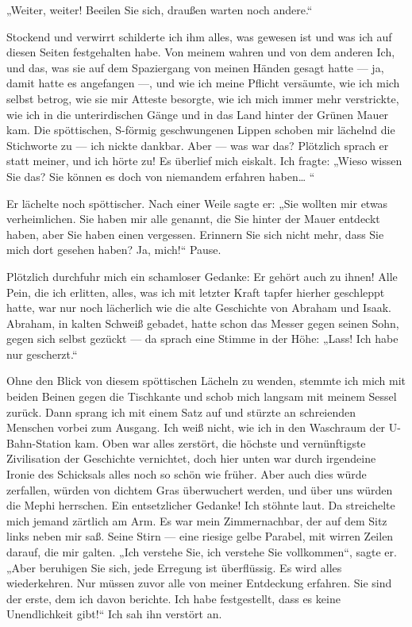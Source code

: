 „Weiter, weiter! Beeilen Sie sich, draußen warten noch andere.“

Stockend und verwirrt schilderte ich ihm alles, was gewesen ist und
was ich auf diesen Seiten festgehalten habe. Von meinem wahren und
von dem anderen Ich, und das, was sie auf dem Spaziergang von
meinen Händen gesagt hatte — ja, damit hatte es angefangen —, und
wie ich meine Pflicht versäumte, wie ich mich selbst betrog, wie
sie mir Atteste besorgte, wie ich mich immer mehr verstrickte, wie
ich in die unterirdischen Gänge und in das Land hinter der Grünen
Mauer kam. Die spöttischen, S-förmig geschwungenen Lippen schoben
mir lächelnd die Stichworte zu — ich nickte dankbar. Aber — was war
das? Plötzlich sprach er statt meiner, und ich hörte zu! Es
überlief mich eiskalt. Ich fragte: „Wieso wissen Sie das? Sie
können es doch von niemandem erfahren haben\ldots{} “

Er lächelte noch spöttischer. Nach einer Weile sagte er: „Sie
wollten mir etwas verheimlichen. Sie haben mir alle genannt, die
Sie hinter der Mauer entdeckt haben, aber Sie haben einen
vergessen. Erinnern Sie sich nicht mehr, dass Sie mich dort gesehen
haben? Ja, mich!“ Pause.

Plötzlich durchfuhr mich ein schamloser Gedanke: Er gehört auch zu
ihnen! Alle Pein, die ich erlitten, alles, was
ich mit letzter Kraft tapfer hierher geschleppt hatte, war nur noch
lächerlich wie die alte Geschichte von Abraham und Isaak. Abraham,
in kalten Schweiß gebadet, hatte schon das Messer gegen seinen
Sohn, gegen sich selbst gezückt — da sprach eine Stimme in der
Höhe: „Lass! Ich habe nur gescherzt.“

Ohne den Blick von diesem spöttischen Lächeln zu wenden, stemmte
ich mich mit beiden Beinen gegen die Tischkante und schob mich
langsam mit meinem Sessel zurück. Dann sprang ich mit einem Satz
auf und stürzte an schreienden Menschen vorbei zum Ausgang. Ich
weiß nicht, wie ich in den Waschraum der U-Bahn-Station kam. Oben
war alles zerstört, die höchste und vernünftigste Zivilisation der
Geschichte vernichtet, doch hier unten war durch irgendeine Ironie
des Schicksals alles noch so schön wie früher. Aber auch dies würde
zerfallen, würden von dichtem Gras überwuchert werden, und über uns
würden die Mephi herrschen. Ein entsetzlicher Gedanke! Ich stöhnte
laut. Da streichelte mich jemand zärtlich am Arm. Es war mein
Zimmernachbar, der auf dem Sitz links neben mir saß. Seine Stirn —
eine riesige gelbe Parabel, mit wirren Zeilen darauf, die mir
galten. „Ich verstehe Sie, ich verstehe Sie vollkommen“, sagte er.
„Aber beruhigen Sie sich, jede Erregung ist überflüssig. Es wird
alles wiederkehren. Nur müssen zuvor alle von meiner Entdeckung
erfahren. Sie sind der erste, dem ich davon berichte. Ich habe
festgestellt, dass es keine Unendlichkeit gibt!“ Ich sah ihn
verstört an.

